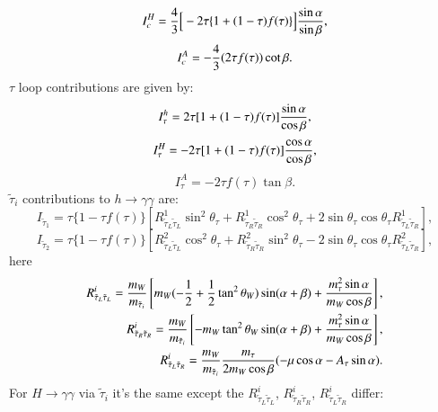 \documentclass[final,3p,times]{elsarticle}
\begin{document}
\begin{equation}
I_{c}^H = {4 \over 3}\Big[-2\tau\{1+(1-\tau)f(\tau)\}\Big]{\sin\alpha \over \sin\beta},
\end{equation}
\begin{equation}
I_{c}^A = -{4 \over 3}(2\tau f(\tau))\cot \beta.
\end{equation}
$\tau$ loop contributions are given by:
\begin{equation}
I_{\tau}^h = 2\tau[1+(1-\tau)f(\tau)]{\sin\alpha \over \cos\beta},
\end{equation}
\begin{equation}
I_{\tau}^H = -2\tau[1+(1-\tau)f(\tau)]{\cos\alpha \over \cos\beta},
\end{equation}
\begin{equation}
I_{\tau}^A = -2\tau f(\tau) \tan\beta.
\end{equation}
$\tilde{\tau}_i$ contributions to $h \rightarrow \gamma \gamma$ are: 
\begin{equation}
I_{\tilde{\tau}_1} = \tau\{1-\tau f(\tau)\}\left[R_{\tilde{\tau}_L \tilde{\tau}_L}^1 \sin^2 \theta_\tau + R_{\tilde{\tau}_R \tilde{\tau}_R}^1 \cos^2 \theta_\tau + 2 \sin \theta_\tau \cos\theta_\tau R_{\tilde{\tau}_L \tilde{\tau}_R}^1\right],
\end{equation}
\begin{equation}
I_{\tilde{\tau}_2} = \tau\{1-\tau f(\tau)\}\left[R_{\tilde{\tau}_L \tilde{\tau}_L}^2 \cos^2 \theta_\tau + R_{\tilde{\tau}_R \tilde{\tau}_R}^2 \sin^2 \theta_\tau - 2 \sin \theta_\tau \cos\theta_\tau R_{\tilde{\tau}_L \tilde{\tau}_R}^2\right],
\end{equation}
here
\begin{align}
R_{\tilde{\tau}_L \tilde{\tau}_L}^i = {m_W \over m_{\tilde{\tau}_i}} \left[m_W (-{1 \over 2}+{1 \over 2}\tan^2 \theta_W)\sin(\alpha+\beta) + {m_{\tau}^2 \sin\alpha \over m_W \cos \beta}\right], \\
R_{\tilde{\tau}_R \tilde{\tau}_R}^i = {m_W \over m_{\tilde{\tau}_i}} \left[-m_W \tan^2 \theta_W\sin(\alpha+\beta) + {m_{\tau}^2 \sin\alpha \over m_W \cos \beta}\right], \\
R_{\tilde{\tau}_L \tilde{\tau}_R}^i = {m_W \over m_{\tilde{\tau}_i}} {m_\tau \over 2 m_W \cos \beta}(-\mu\cos\alpha -A_\tau \sin\alpha).
\end{align}
For $H \rightarrow \gamma \gamma$ via $\tilde{\tau}_i$ it's the same except the $R_{\tilde{\tau}_L \tilde{\tau}_L}^i$, $R_{\tilde{\tau}_R \tilde{\tau}_R}^i$, $R_{\tilde{\tau}_L \tilde{\tau}_R}^i$ differ:
\end{document}
